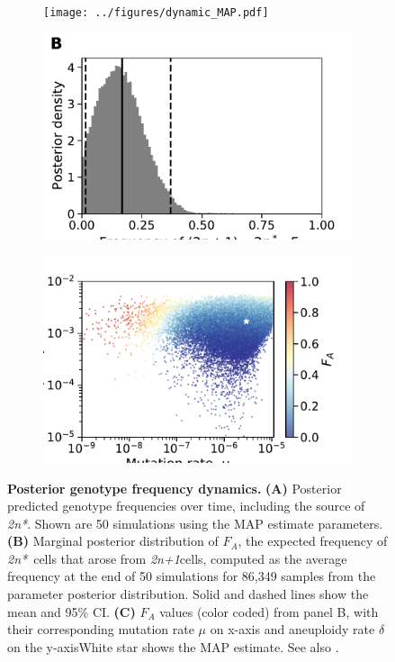 \documentclass[12pt]{extarticle}
\newcommand{\anwt}{\emph{2n+1}}
\newcommand{\eumt}{\emph{2n*}}
\begin{document}
\begin{figure}[h!]
  \begin{subfigure}{\textwidth}
      \centering
      \texttt{[image: ../figures/dynamic\_MAP.pdf]}      
  \end{subfigure}
  \begin{subfigure}{0.5\textwidth}
      \centering
      \includegraphics[width=\textwidth]{../figures/histo_100000.pdf}
  \end{subfigure}
  \begin{subfigure}{0.5\textwidth}
      \centering
      \includegraphics[width=\textwidth]{../figures/scatter100000_log_star.pdf}
  \end{subfigure}
  \caption{
    \textbf{Posterior genotype frequency dynamics.}     
    \textbf{(A)} Posterior predicted genotype frequencies over time, including the source of \eumt. Shown are 50 simulations using the MAP estimate parameters.
    \textbf{(B)} Marginal posterior distribution of $F_A$, the expected frequency of \eumt\ cells that arose from \anwt cells, computed as the average frequency at the end of 50 simulations for 86,349 samples from the parameter posterior distribution. Solid and dashed lines show the mean and 95\% CI.
	\textbf{(C)} $F_A$ values (color coded) from panel B, with their corresponding mutation rate $\mu$ on x-axis and aneuploidy rate $\delta$ on the y-axisWhite star shows the MAP estimate. See also .
     }
  \label{fig:ppc-plot}
\end{figure}
\end{document}
